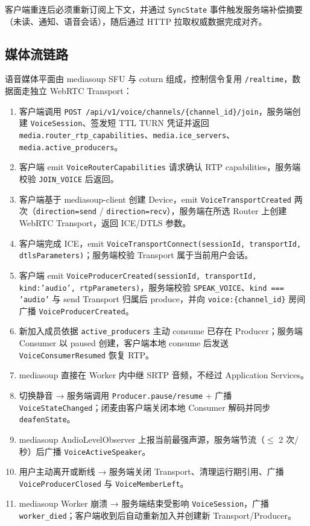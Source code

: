 客户端重连后必须重新订阅上下文，并通过 \texttt{SyncState} 事件触发服务端补偿摘要（未读、通知、语音会话），随后通过 HTTP 拉取权威数据完成对齐。

\subsection{媒体流链路}

语音媒体平面由 mediasoup SFU 与 coturn 组成，控制信令复用 \texttt{/realtime}，数据面走独立 WebRTC Transport：

\begin{enumerate}
  \item 客户端调用 \texttt{POST /api/v1/voice/channels/\{channel\_id\}/join}，服务端创建 \texttt{VoiceSession}、签发短 TTL TURN 凭证并返回 \texttt{media.router\_rtp\_capabilities}、\texttt{media.ice\_servers}、\texttt{media.active\_producers}。
  \item 客户端 emit \texttt{VoiceRouterCapabilities} 请求确认 RTP capabilities，服务端校验 \texttt{JOIN\_VOICE} 后返回。
  \item 客户端基于 mediasoup-client 创建 Device，emit \texttt{VoiceTransportCreated} 两次（\texttt{direction=send} / \texttt{direction=recv}），服务端在所选 Router 上创建 WebRTC Transport，返回 ICE/DTLS 参数。
  \item 客户端完成 ICE，emit \texttt{VoiceTransportConnect(sessionId, transportId, dtlsParameters)}；服务端校验 Transport 属于当前用户会话。
  \item 客户端 emit \texttt{VoiceProducerCreated(sessionId, transportId, kind:'audio', rtpParameters)}，服务端校验 \texttt{SPEAK\_VOICE}、\texttt{kind === 'audio'} 与 send Transport 归属后 produce，并向 \texttt{voice:\{channel\_id\}} 房间广播 \texttt{VoiceProducerCreated}。
  \item 新加入成员依据 \texttt{active\_producers} 主动 consume 已存在 Producer；服务端 Consumer 以 paused 创建，客户端本地 consume 后发送 \texttt{VoiceConsumerResumed} 恢复 RTP。
  \item mediasoup 直接在 Worker 内中继 SRTP 音频，不经过 Application Services。
  \item 切换静音 → 服务端调用 \texttt{Producer.pause/resume} + 广播 \texttt{VoiceStateChanged}；闭麦由客户端关闭本地 Consumer 解码并同步 \texttt{deafenState}。
  \item mediasoup AudioLevelObserver 上报当前最强声源，服务端节流（$\leq$ 2 次/秒）后广播 \texttt{VoiceActiveSpeaker}。
  \item 用户主动离开或断线 → 服务端关闭 Transport、清理运行期引用、广播 \texttt{VoiceProducerClosed} 与 \texttt{VoiceMemberLeft}。
  \item mediasoup Worker 崩溃 → 服务端结束受影响 \texttt{VoiceSession}，广播 \texttt{worker\_died}；客户端收到后自动重新加入并创建新 Transport/Producer。
\end{enumerate}

